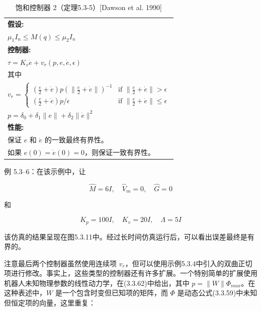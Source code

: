 \documentclass[UTF8,12pt,a4paper]{ctexart}
\begin{document}
\begin{table}[htbp]
\centering
\caption{饱和控制器 2（定理5.3-5）[Dawson et al. 1990]}
\label{tab:5.3.5}
\begin{tabular}{@{}l@{}}
\toprule
\textbf{假设:} \\[0.5em]
\quad $\displaystyle \mu_1 I_n \leq M(q) \leq \mu_2 I_n$ \\[1em]
\midrule
\textbf{控制器:} \\[0.5em]
\quad $\displaystyle \tau = K_v \dot{e} + v_r(p, e, \dot{e}, \epsilon)$ \\[0.5em]
\quad 其中 \\[0.5em]
\quad $\displaystyle v_r = \begin{cases} \left(\frac{e}{2} + \dot{e}\right)p\left(\|\frac{e}{2} + \dot{e}\|\right)^{-1} & \text{if } \|\frac{e}{2} + \dot{e}\| > \epsilon \\ \left(\frac{e}{2} + \dot{e}\right)p/\epsilon & \text{if } \|\frac{e}{2} + \dot{e}\| \leq \epsilon \end{cases}$ \\[0.8em]
\quad $\displaystyle p = \delta_0 + \delta_1\|e\| + \delta_2\|\dot{e}\|^2$ \\[1em]
\midrule
\textbf{性能:} \\
\quad 保证 $e$ 和 $\dot{e}$ 的一致最终有界性。 \\
\quad 如果 $e(0) = \dot{e}(0) = 0$，则保证一致有界性。 \\
\bottomrule
\end{tabular}
\end{table}

\begin{example}[饱和控制器 2]
例 5.3--6：在该示例中，让

\begin{equation*}
\hat{M} = 6I, \quad \hat{V}_m = 0, \quad \hat{G} = 0
\end{equation*}

和

\begin{equation*}
K_p = 100I, \quad K_v = 20I, \quad \Lambda = 5I
\end{equation*}

该仿真的结果呈现在图5.3.11中。经过长时间仿真运行后，可以看出误差最终是有界的。
\end{example}

注意最后两个控制器虽然使用连续项 $v_r$，但可以使用示例5.3.4中引入的双曲正切项进行修改。事实上，这些类型的控制器还有许多扩展。一个特别简单的扩展使用机器人未知物理参数的线性动力学，在(3.3.62)中给出，其中 $p = \|W\|\Phi_{max}$。在这种表述中，$W$ 是一个包含时变但已知项的矩阵，而 $\Phi$ 是动态公式(3.3.59)中未知但恒定项的向量，这里重复：
\end{document}
